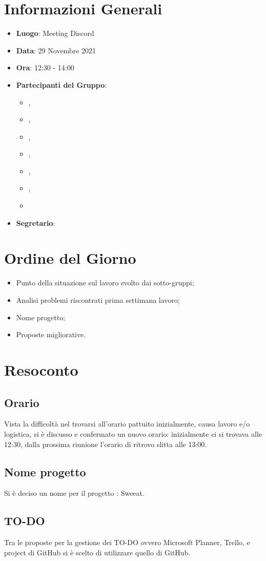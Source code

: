 \section{Informazioni Generali}

\begin{itemize}
\item{\textbf{Luogo}}: Meeting Discord
\item{\textbf{Data}}: 29 Novembre 2021
\item{\textbf{Ora}}: 12:30 - 14:00
\item{\textbf{Partecipanti del Gruppo}}: 
	\begin{itemize}
	\item{\EP{},} 
	\item{\FP{},}
	\item{\GC{},}
	\item{\LW{},}
	\item{\MB{},}
	\item{\MG{},}
	\item{\PV{}}
	\end{itemize} 
\item{\textbf{Segretario}}: \PV{}	
\end{itemize}

\section{Ordine del Giorno}
\begin{itemize}
\item{Punto della situazione sul lavoro svolto dai sotto-gruppi;}
\item{Analisi problemi riscontrati prima settimana lavoro;}
\item{Nome progetto;}
\item{Proposte migliorative.}
\end{itemize}

\section{Resoconto}

\subsection{Orario}
Vista la difficoltà nel trovarsi all'orario pattuito inizialmente, causa lavoro e/o logistica, si è discusso e confermato un nuovo orario: inizialmente ci si trovava alle 12:30, dalla prossima riunione l'orario di ritrovo slitta alle 13:00.

\subsection{Nome progetto}
Si è deciso un nome per il progetto : Sweeat.


\subsection{TO-DO}
Tra le proposte per la gestione dei TO-DO ovvero Microsoft Planner, Trello, e project di GitHub si è scelto di utilizzare quello di GitHub.